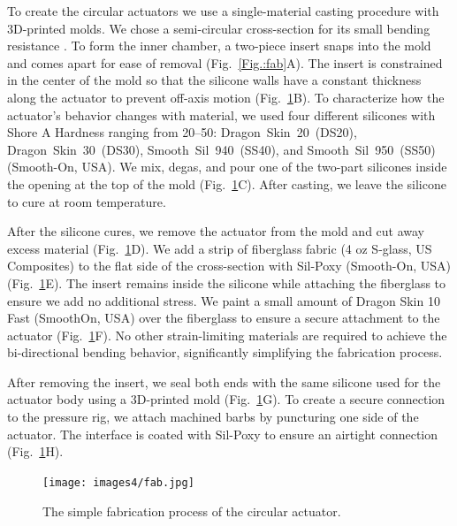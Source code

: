 To create the circular actuators we use a single-material casting procedure with 3D-printed molds. We chose a semi-circular cross-section for its small bending resistance \cite{polygerinos_modeling_2015}. To form the inner chamber, a two-piece insert snaps into the mold and comes apart for ease of removal (Fig.~\ref{Fig.:fab}A). The insert is constrained in the center of the mold so that the silicone walls have a constant thickness along the actuator to prevent off-axis motion (Fig.~\ref{figure:fab}B). To characterize how the actuator's behavior changes with material, we used four different silicones with Shore A Hardness ranging from 20--50: Dragon~Skin~20~(DS20), Dragon~Skin~30~(DS30), Smooth~Sil~940~(SS40), and Smooth~Sil~950~(SS50) (Smooth-On, USA). We mix, degas, and pour one of the two-part silicones inside the opening at the top of the mold (Fig.~\ref{figure:fab}C). After casting, we leave the silicone to cure at room temperature. 

After the silicone cures, we remove the actuator from the mold and cut away excess material (Fig.~\ref{figure:fab}D). We add a strip of fiberglass fabric (4 oz S-glass, US Composites) to the flat side of the cross-section with Sil-Poxy (Smooth-On, USA) (Fig.~\ref{figure:fab}E). The insert remains inside the silicone while attaching the fiberglass to ensure we add no additional stress. We paint a small amount of Dragon Skin 10 Fast (SmoothOn, USA) over the fiberglass to ensure a secure attachment to the actuator (Fig.~\ref{figure:fab}F). No other strain-limiting materials are required to achieve the bi-directional bending behavior, significantly simplifying the fabrication process. 

After removing the insert, we seal both ends with the same silicone used for the actuator body using a 3D-printed mold (Fig.~\ref{figure:fab}G). To create a secure connection to the pressure rig, we attach machined barbs by puncturing one side of the actuator. The interface is coated with Sil-Poxy to ensure an airtight connection (Fig.~\ref{figure:fab}H).

\begin{figure}[h!]
    \centering
     \texttt{[image: images4/fab.jpg]}
    \caption{The simple fabrication process of the circular actuator.}
    \label{figure:fab}
\end{figure}